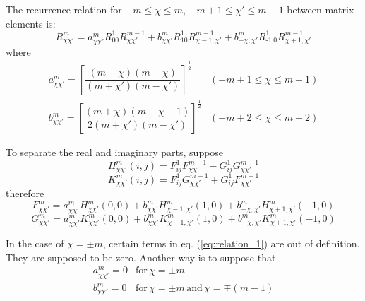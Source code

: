 The recurrence relation for $-m\leq\chi\leq m$, $-m+1\leq\chi'\leq m-1$
between matrix elements is:
\begin{equation}
R_{\chi\chi'}^{m}=a_{\chi\chi'}^{m}R_{00}^{1}R_{\chi\chi'}^{m-1}+b_{\chi\chi'}^{m}R_{10}^{1}R_{\chi-1,\chi'}^{m-1}+b_{-\chi,\chi'}^{m}R_{\text{-1,}0}^{1}R_{\chi+1,\chi'}^{m-1}\label{eq:relation_1}
\end{equation}
where
\begin{equation}
\begin{array}{ll}
a_{\chi\chi'}^{m}=\left[\dfrac{\left(m+\chi\right)\left(m-\chi\right)}{\left(m+\chi'\right)\left(m-\chi'\right)}\right]^{\frac{1}{2}} & (-m+1\leq\chi\leq m-1)\\
b_{\chi\chi'}^{m}=\left[\dfrac{\left(m+\chi\right)\left(m+\chi-1\right)}{2\left(m+\chi'\right)\left(m-\chi'\right)}\right]^{\frac{1}{2}} & (-m+2\leq\chi\leq m-2)
\end{array}
\end{equation}


To separate the real and imaginary parts, suppose
\begin{equation}
H_{\chi\chi'}^{m}(i,j)=F_{ij}^{1}F_{\chi\chi'}^{m-1}-G_{ij}^{1}G_{\chi\chi'}^{m-1}
\end{equation}
\begin{equation}
K_{\chi\chi'}^{m}(i,j)=F_{ij}^{1}G_{\chi\chi'}^{m-1}+G_{ij}^{1}F_{\chi\chi'}^{m-1}
\end{equation}
therefore
\begin{equation}
F_{\chi\chi'}^{m}=a_{\chi\chi'}^{m}H_{\chi\chi'}^{m}(0,0)+b_{\chi\chi'}^{m}H_{\chi-1,\chi'}^{m}(1,0)+b_{-\chi,\chi'}^{m}H_{\chi+1,\chi'}^{m}(-1,0)
\end{equation}
\begin{equation}
G_{\chi\chi'}^{m}=a_{\chi\chi'}^{m}K_{\chi\chi'}^{m}(0,0)+b_{\chi\chi'}^{m}K_{\chi-1,\chi'}^{m}(1,0)+b_{-\chi,\chi'}^{m}K_{\chi+1,\chi'}^{m}(-1,0)
\end{equation}


In the case of $\chi=\pm m$, certain terms in eq. (\ref{eq:relation_1})
are out of definition. They are supposed to be zero. Another way is
to suppose that
\begin{equation}
\begin{array}{ll}
a_{\chi\chi'}^{m}=0 & \mathrm{for}\,\chi=\pm m\\
b_{\chi\chi'}^{m}=0 & \mathrm{for}\,\chi=\pm m\,\mathrm{and}\,\chi=\mp(m-1)
\end{array}
\end{equation}



